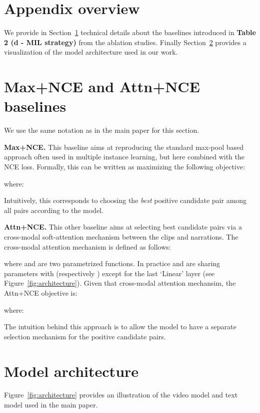 \documentclass[10pt,twocolumn,letterpaper]{article}
\begin{document}
{\small


}

\clearpage
\appendix

\section*{Appendix overview}

We provide in Section~\ref{mil-baselines} technical details about the baselines introduced in \textbf{Table 2 (d - MIL strategy)} from the ablation studies.
Finally Section~\ref{model-architecture} provides a visualization of the model architecture used in our work.


\section{Max+NCE and Attn+NCE baselines} \label{mil-baselines}
We use the same notation as in the main paper for this section. 


\noindent
{\bf Max+NCE.} This baseline aims at reproducing the standard max-pool based approach often used in multiple instance learning, but here combined with the NCE loss.
Formally, this can be written as maximizing the following objective:


where: 


Intuitively, this corresponds to choosing the \emph{best} positive candidate pair among all pairs  according to the model.

\noindent
{\bf Attn+NCE.} 
This other baseline aims at selecting best candidate pairs via a cross-modal soft-attention mechanism between the clips and narrations. 
The cross-modal attention mechanism  is defined as follows:

where  and  are two parametrized functions.
In practice  and  are sharing parameters with  (respectively ) except for the last `Linear' layer (see Figure~\ref{fig:architecture}).
Given that cross-modal attention mechansim, the Attn+NCE objective is:

where: 

The intuition behind this approach is to allow the model to have a separate selection mechanism for the positive candidate pairs.


\section{Model architecture} \label{model-architecture}
Figure~\ref{fig:architecture} provides an illustration of the video model  and text model  used in the main paper.
\end{document}
